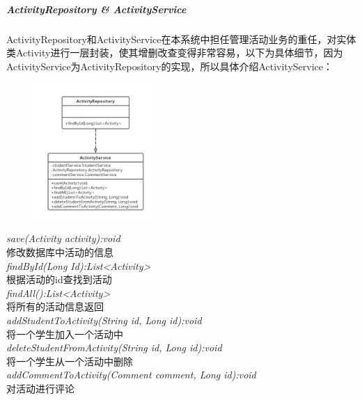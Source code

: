 \documentclass[UTF8]{ctexart}
\begin{document}
\subparagraph{ActivityRepository \& ActivityService}
ActivityRepository和ActivityService在本系统中担任管理活动业务的重任，对实体类Activity进行一层封装，使其增删改查变得非常容易，以下为具体细节，因为ActivityService为ActivityRepository的实现，所以具体介绍ActivityService：
\newline
\begin{figure}[H]
\centering
\includegraphics[width = 0.4\textwidth]{activity-rs.png}
\end{figure}
\begin{center}
\emph{save(Activity activity):void}\\
修改数据库中活动的信息\\
\emph{findById(Long Id):List<Activity>}\\
根据活动的id查找到活动\\
\emph{findAll():List<Activity>}\\
将所有的活动信息返回\\
\emph{addStudentToActivity(String id, Long id):void}\\
将一个学生加入一个活动中\\
\emph{deleteStudentFromActivity(String id, Long id):void}\\
将一个学生从一个活动中删除\\
\emph{addCommentToActivity(Comment comment, Long id):void}\\
对活动进行评论
\end{center}
\end{document}
